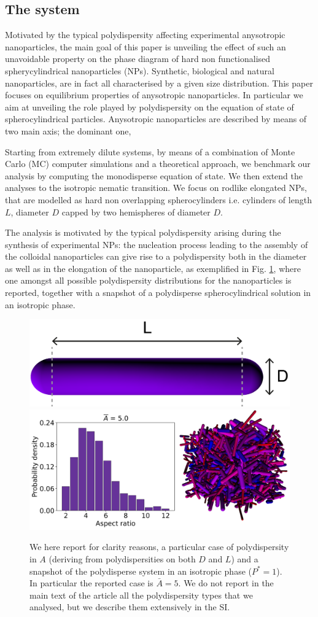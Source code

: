 \documentclass[journal=jacsat,manuscript=article]{achemso}
\begin{document}
\subsection{The system}
Motivated by the typical polydispersity affecting experimental anysotropic nanoparticles,  the main goal  of this paper is unveiling the effect of such an unavoidable property  on the phase diagram of hard non functionalised spherycylindrical nanoparticles (NPs). Synthetic,  biological  and natural nanoparticles, are in fact all characterised by a given size distribution. This paper focuses on equilibrium properties of anysotropic nanoparticles. In particular we aim at unveiling the role played by polydispersity on the equation of state of spherocylindrical particles. Anysotropic nanoparticles are described by means of two main axis; the dominant one, 

Starting from extremely dilute systems, by means of a combination of Monte Carlo (MC) computer simulations and a theoretical approach, we benchmark our analysis by computing the monodisperse equation of state. We then extend the analyses to the isotropic nematic transition. We focus on rodlike elongated NPs, that are modelled as hard non overlapping spherocylinders i.e. cylinders of length $L$, diameter $D$ capped by two hemispheres of diameter $D$. 



The analysis is motivated by the typical polydispersity arising during the synthesis of experimental NPs: the nucleation process leading to the assembly of the colloidal nanoparticles can give rise to a polydispersity both in the diameter as well as in the elongation of the nanoparticle, as exemplified in  Fig. \ref{fig:HSC_model}, where one amongst all possible polydispersity distributions for the nanoparticles is reported, together with a snapshot of a  polydisperse spherocylindrical solution  in an isotropic phase. 
\begin{figure}[!ht]
    \centering
    \includegraphics[width=0.2 \columnwidth]{Figures/A5_scheme.png}
    \includegraphics[width=0.7\columnwidth]{Figures/Polydisp_hist.png}
    \caption{We here report for clarity reasons, a particular case of polydispersity  in $A$ (deriving from polydispersities on both $D$ and $L$) and a snapshot of the polydisperse system  in an isotropic phase ($P^*=1$). In particular the reported case is $\bar{A}=5$. We do not report in the main text of the article all the polydispersity types that we analysed, but we describe  them extensively  in the SI.}
    \label{fig:HSC_model}
\end{figure}
\end{document}
